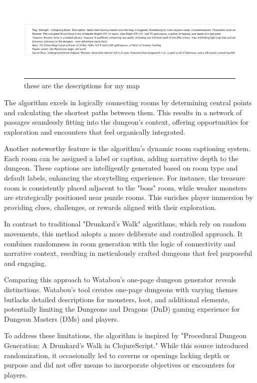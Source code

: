 \documentclass[10pt,twocolumn]{article}
\begin{document}
\begin{figure}
    \centering
    \includegraphics[width=0.5\linewidth]{desc.png}
    \caption{these are the descriptions for my map}
    \label{these are the descriptions for my map}
\end{figure}

The algorithm excels in logically connecting rooms by determining central points and calculating the shortest paths between them. This results in a network of passages seamlessly fitting into the dungeon's context, offering opportunities for exploration and encounters that feel organically integrated.

Another noteworthy feature is the algorithm's dynamic room captioning system. Each room can be assigned a label or caption, adding narrative depth to the dungeon. These captions are intelligently generated based on room type and default labels, enhancing the storytelling experience. For instance, the treasure room is consistently placed adjacent to the "boss" room, while weaker monsters are strategically positioned near puzzle rooms. This enriches player immersion by providing clues, challenges, or rewards aligned with their exploration.

In contrast to traditional "Drunkard's Walk" algorithms, which rely on random movements, this method adopts a more deliberate and controlled approach. It combines randomness in room generation with the logic of connectivity and narrative context, resulting in meticulously crafted dungeons that feel purposeful and engaging.

Comparing this approach to Watabou's one-page dungeon generator reveals distinctions. Watabou's tool creates one-page dungeons with varying themes butlacks detailed descriptions for monsters, loot, and additional elements, potentially limiting the Dungeons and Dragons (DnD) gaming experience for Dungeon Masters (DMs) and players.

To address these limitations, the algorithm is inspired by "Procedural Dungeon Generation: A Drunkard's Walk in ClojureScript." While this source introduced \cite{jrheard_dungeon_clojurescript}randomization, it occasionally led to caverns or openings lacking depth or purpose and did not offer means to incorporate objectives or encounters for players.
\end{document}
